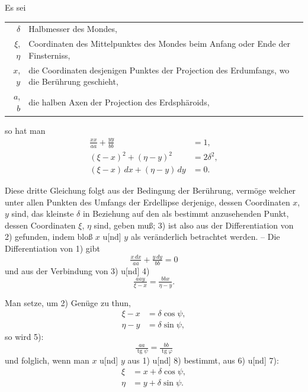 \documentclass[12pt,a4paper]{article}
\theoremstyle{plain}
\theoremstyle{definition}
\theoremstyle{remark}
\DeclareMathOperator{\tg}{tg}
\begin{document}
Es sei
\begin{center}
\begin{tabular}{r@{\ldots\ }l}
$\delta$ & Halbmesser des Mondes, \\
$\xi$, $\eta$ & Coordinaten des Mittelpunktes des Mondes beim Anfang oder Ende der Finsterniss, \\
$x$, $y$ & die Coordinaten desjenigen Punktes der Projection des Erdumfangs, wo die Ber\"uhrung geschieht, \\
$a$, $b$ & die halben Axen der Projection des Erdsph\"aroids,
\end{tabular}
\end{center}

so hat man
\begin{align}
\tfrac{xx}{aa} + \tfrac{yy}{bb} &= 1, \\
(\xi - x)^2 + (\eta - y)^2 &= 2\delta^2, \\
(\xi - x)\,dx + (\eta - y)\,dy &= 0.
\end{align}

Diese dritte Gleichung folgt aus der Bedingung der Ber\"uhrung, verm\"oge welcher unter allen Punkten des Umfangs der Erdellipse derjenige, dessen Coordinaten $x$, $y$ sind, das kleinste $\delta$ in Beziehung auf den als bestimmt anzusehenden Punkt, dessen Coordinaten $\xi$, $\eta$ sind, geben mu\ss; 3) ist also aus der Differentiation von 2) gefunden, indem blo\ss{} $x$ u[nd] $y$ als ver\"anderlich betrachtet werden. -- Die Differentiation von 1) gibt
\begin{equation}
\tfrac{x\,dx}{aa} + \tfrac{y\,dy}{bb} = 0
\end{equation}
und aus der Verbindung von 3) u[nd] 4)
\begin{equation}
\tfrac{aa y}{\xi - x} = \tfrac{bb x}{\eta - y}.
\end{equation}

Man setze, um 2) Gen\"uge zu thun,
\begin{align}
\xi - x &= \delta\cos\psi, \\
\eta - y &= \delta\sin\psi,
\end{align}
so wird 5):
\begin{equation}
\tfrac{aa}{\tg\psi} = \tfrac{bb}{\tg\varphi}
\end{equation}
und folglich, wenn man $x$ u[nd] $y$ aus 1) u[nd] 8) bestimmt, aus 6) u[nd] 7):
\begin{align}
\xi &= x + \delta\cos\psi, \\
\eta &= y + \delta\sin\psi.
\end{align}
\end{document}
